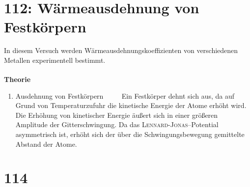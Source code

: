 \newpage
\section{112: Wärmeausdehnung von Festkörpern}
In diesem Versuch werden Wärmeausdehnungskoeffizienten von verschiedenen Metallen experimentell bestimmt.\\\\
\textbf{Theorie} 
\begin{enumerate}[label=--]
        \item Ausdehnung von Festkörpern $\qquad $ 
                Ein Festkörper dehnt sich aus, da auf Grund von Temperaturzufuhr die kinetische Energie der Atome erhöht wird. Die Erhöhung von kinetischer Energie äußert sich in einer größeren Amplitude der Gitterschwingung. 
                Da das \textsc{Lennard-Jonas}--Potential asymmetrisch ist, erhöht sich der über die Schwingungsbewegung gemittelte Abstand der Atome.
\end{enumerate}

\newpage
\section{114}
